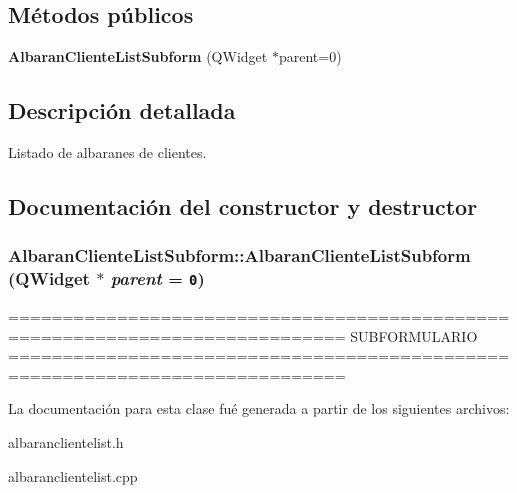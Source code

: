 \subsection*{M\'{e}todos p\'{u}blicos}
\begin{CompactItemize}
\item 
{\bf Albaran\-Cliente\-List\-Subform} (QWidget $\ast$parent=0)
\end{CompactItemize}


\subsection{Descripci\'{o}n detallada}
Listado de albaranes de clientes. 



\subsection{Documentaci\'{o}n del constructor y destructor}
\subsubsection{\setlength{\rightskip}{0pt plus 5cm}Albaran\-Cliente\-List\-Subform::Albaran\-Cliente\-List\-Subform (QWidget $\ast$ {\em parent} = {\tt 0})}\label{classAlbaranClienteListSubform_a0}


============================================================================= SUBFORMULARIO ============================================================================= 

La documentaci\'{o}n para esta clase fu\'{e} generada a partir de los siguientes archivos:\begin{CompactItemize}
\item 
albaranclientelist.h\item 
albaranclientelist.cpp\end{CompactItemize}
